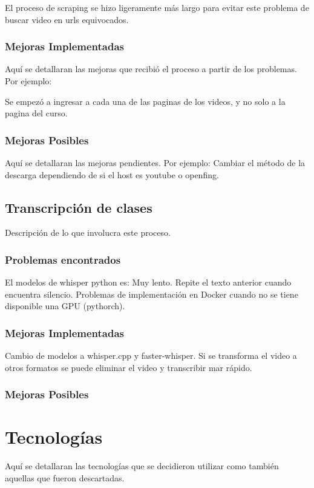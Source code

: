 \documentclass{../../prgrado}
\begin{document}
El proceso de scraping se hizo ligeramente más largo para evitar este problema de buscar video en urls equivocados.

\subsection{Mejoras Implementadas}

Aquí se detallaran las mejoras que recibió el proceso a partir de los problemas. 
Por ejemplo: 

Se empezó a ingresar a cada una de las paginas de los videos, y no solo a la pagina del curso.
\subsection{Mejoras Posibles}
Aquí se detallaran las mejoras pendientes.
Por ejemplo: 
Cambiar el método de la descarga dependiendo de si el host es youtube o \gls{openfing}.

\section{Transcripción de clases}

Descripción de lo que involucra este proceso.
\subsection{Problemas encontrados}
El modelos de whisper python es:
    Muy lento.
    Repite el texto anterior cuando encuentra silencio. 
    Problemas de implementación en Docker cuando no se tiene disponible una GPU (pythorch).
\subsection{Mejoras Implementadas}
Cambio de modelos a whisper.cpp y faster-whisper. Si se transforma el video a otros formatos se puede eliminar el video y transcribir mar rápido. 
\subsection{Mejoras Posibles}




\chapter{Tecnologías}
Aquí se detallaran las tecnologías que se decidieron utilizar como también aquellas que fueron descartadas.
\end{document}

